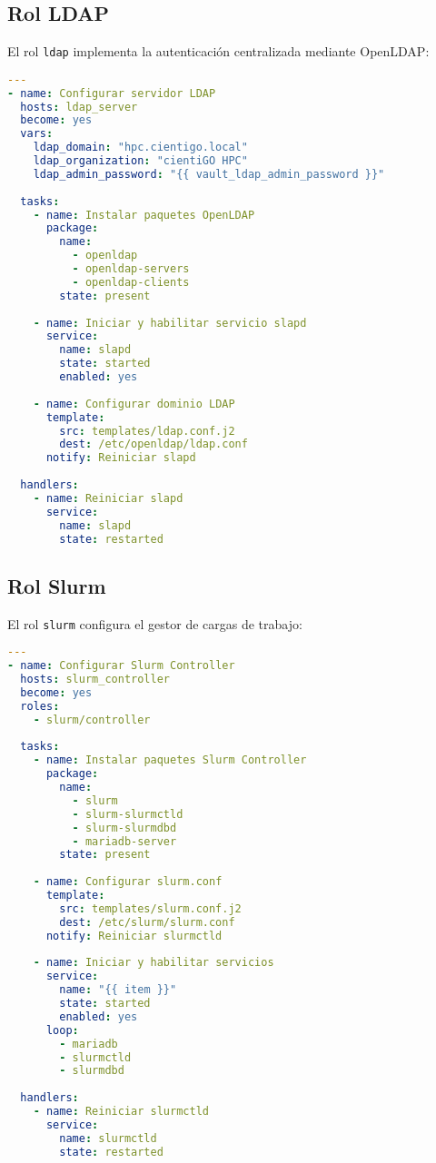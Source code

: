 \documentclass[12pt,a4paper]{report}
\begin{document}
\subsection{Rol LDAP}

El rol \texttt{ldap} implementa la autenticación centralizada mediante OpenLDAP:

\begin{lstlisting}[language=yaml]
---
- name: Configurar servidor LDAP
  hosts: ldap_server
  become: yes
  vars:
    ldap_domain: "hpc.cientigo.local"
    ldap_organization: "cientiGO HPC"
    ldap_admin_password: "{{ vault_ldap_admin_password }}"
  
  tasks:
    - name: Instalar paquetes OpenLDAP
      package:
        name:
          - openldap
          - openldap-servers
          - openldap-clients
        state: present
    
    - name: Iniciar y habilitar servicio slapd
      service:
        name: slapd
        state: started
        enabled: yes
    
    - name: Configurar dominio LDAP
      template:
        src: templates/ldap.conf.j2
        dest: /etc/openldap/ldap.conf
      notify: Reiniciar slapd
  
  handlers:
    - name: Reiniciar slapd
      service:
        name: slapd
        state: restarted
\end{lstlisting}

\subsection{Rol Slurm}

El rol \texttt{slurm} configura el gestor de cargas de trabajo:

\begin{lstlisting}[language=yaml]
---
- name: Configurar Slurm Controller
  hosts: slurm_controller
  become: yes
  roles:
    - slurm/controller
  
  tasks:
    - name: Instalar paquetes Slurm Controller
      package:
        name:
          - slurm
          - slurm-slurmctld
          - slurm-slurmdbd
          - mariadb-server
        state: present
    
    - name: Configurar slurm.conf
      template:
        src: templates/slurm.conf.j2
        dest: /etc/slurm/slurm.conf
      notify: Reiniciar slurmctld
    
    - name: Iniciar y habilitar servicios
      service:
        name: "{{ item }}"
        state: started
        enabled: yes
      loop:
        - mariadb
        - slurmctld
        - slurmdbd
  
  handlers:
    - name: Reiniciar slurmctld
      service:
        name: slurmctld
        state: restarted
\end{lstlisting}
\end{document}
